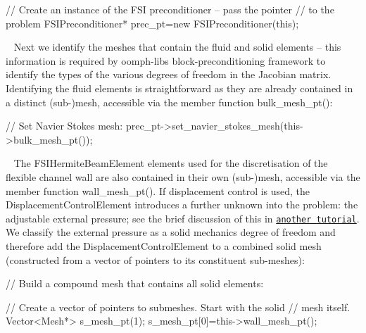 \begin{DoxyEnumerate}
\begin{DoxyCodeInclude}
      \textcolor{comment}{// Create an instance of the FSI preconditioner -- pass the pointer}
      \textcolor{comment}{// to the problem}
      FSIPreconditioner* prec\_pt=\textcolor{keyword}{new} FSIPreconditioner(\textcolor{keyword}{this});

\end{DoxyCodeInclude}
 ~\newline
 Next we identify the meshes that contain the fluid and solid elements -- this information is required by {\ttfamily oomph-\/lib\textquotesingle{}s} block-\/preconditioning framework to identify the types of the various degrees of freedom in the Jacobian matrix. Identifying the fluid elements is straightforward as they are already contained in a distinct (sub-\/)mesh, accessible via the member function {\ttfamily bulk\+\_\+mesh\+\_\+pt()}\+: ~\newline
~\newline
 
\begin{DoxyCodeInclude}

      \textcolor{comment}{// Set Navier Stokes mesh:}
      prec\_pt->set\_navier\_stokes\_mesh(this->bulk\_mesh\_pt());

\end{DoxyCodeInclude}
 ~\newline
 The {\ttfamily F\+S\+I\+Hermite\+Beam\+Element} elements used for the discretisation of the flexible channel wall are also contained in their own (sub-\/)mesh, accessible via the member function {\ttfamily wall\+\_\+mesh\+\_\+pt()}. If displacement control is used, the {\ttfamily Displacement\+Control\+Element} introduces a further unknown into the problem\+: the adjustable external pressure; see the brief discussion of this in \href{../../../interaction/fsi_channel_segregated_solver/html/index.html}{\tt another tutorial}. We classify the external pressure as a solid mechanics degree of freedom and therefore add the {\ttfamily Displacement\+Control\+Element} to a combined solid mesh (constructed from a vector of pointers to its constituent sub-\/meshes)\+: ~\newline
~\newline
 
\begin{DoxyCodeInclude}
      \textcolor{comment}{// Build a compound mesh that contains all solid elements:}
      
      \textcolor{comment}{// Create a vector of pointers to submeshes. Start with the solid}
      \textcolor{comment}{// mesh itself.}
      Vector<Mesh*> s\_mesh\_pt(1);
      s\_mesh\_pt[0]=this->wall\_mesh\_pt();
      

\end{DoxyCodeInclude}
\end{DoxyEnumerate}
